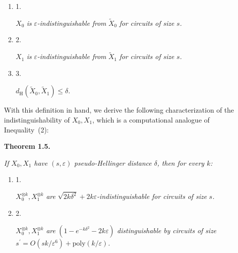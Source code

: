 \begin{enumerate}


\item[] 
1. 


$X_{0}$\emph{ is }$\varepsilon$\emph{-indistinguishable from }$\widetilde{X}_{0}$\emph{ for circuits of size }$s$\emph{.}\par





\item[] 
2. 


$X_{1}$\emph{ is }$\varepsilon$\emph{-indistinguishable from }$\widetilde{X}_{1}$\emph{ for circuits of size }$s$\emph{.}\par





\item[] 
3. 


$d_{\mathrm{H}}(\widetilde{X}_{0},\widetilde{X}_{1})\leq\delta$\emph{.}\par





\end{enumerate}






With this definition in hand, we derive the following characterization of the indistinguishability of $X_{0},X_{1}$, which is a computational analogue of Inequality (2):\par





\par\medskip\noindent\textbf{
\textbf{Theorem 1.5}\textbf{.}
}\par



\emph{If $X_{0},X_{1}$ have $(s,\varepsilon)$ pseudo-Hellinger distance $\delta$, then for every $k$:}\par


\begin{enumerate}


\item[] 
1. 


$X_{0}^{\otimes k},X_{1}^{\otimes k}$\emph{ are }$\sqrt{2k\delta^{2}}+2k\varepsilon$\emph{-indistinguishable for circuits of size }$s$\emph{.}\par





\item[] 
2. 


$X_{0}^{\otimes k},X_{1}^{\otimes k}$\emph{ are }$(1-e^{-k\delta^{2}}-2k\varepsilon)$\emph{ distinguishable by circuits of size }$s^{\prime}=O(sk/\varepsilon^{6})+\mathrm{poly}(k/\varepsilon)$\emph{.}\par





\end{enumerate}




